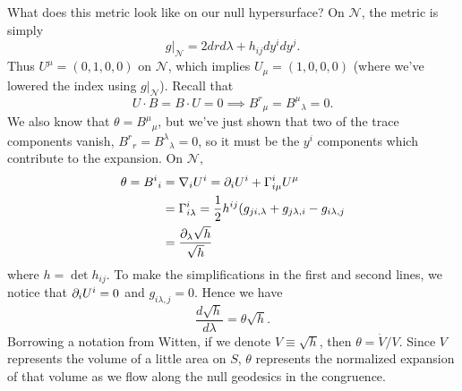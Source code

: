 What does this metric look like on our null hypersurface? On $\mathcal{N}$, the metric is simply
\begin{equation}\label{nullhsurfacemetric}
    g|_{\mathcal{N}}= 2drd\lambda +h_{ij} dy^i dy^j.
\end{equation}
Thus $U^\mu=(0,1,0,0)$ on $\mathcal{N}$, which implies $U_\mu=(1,0,0,0)$ (where we've lowered the index using $g|_{\mathcal{N}}$). Recall that 
\begin{equation}
    U\cdot B = B\cdot U=0 \implies B^r{}_\mu = B^\mu{}_\lambda = 0.
\end{equation}
We also know that $\theta=B^\mu{}_\mu$, but we've just shown that two of the trace components vanish, $B^r{}_r=B^\lambda{}_\lambda=0$, so it must be the $y^i$ components which contribute to the expansion. On $\mathcal{N},$
\begin{align}
    \theta = B^i{}_i &=\nabla_i U^i = \partial_i U^i +\Gamma^i_{i\mu} U^\mu\\
    &= \Gamma^i_{i \lambda} =\frac{1}{2} h^{ij}(g_{ji,\lambda} + g_{j\lambda,i}-g_{i\lambda,j}\\
    &= \frac{\partial_\lambda\sqrt{h}}{\sqrt{h}}
\end{align}
where $h=\det h_{ij}$. To make the simplifications in the first and second lines, we notice that $\partial_i U^i=0$ and $g_{i\lambda,j}=0$. Hence we have
\begin{equation}
    \frac{d\sqrt{h}}{d\lambda} = \theta \sqrt{h}.
\end{equation}
Borrowing a notation from Witten, if we denote $V\equiv \sqrt{h}$, then $\theta = \dot V/V$. Since $V$ represents the volume of a little area on $S$, $\theta$ represents the normalized expansion of that volume as we flow along the null geodesics in the congruence.

